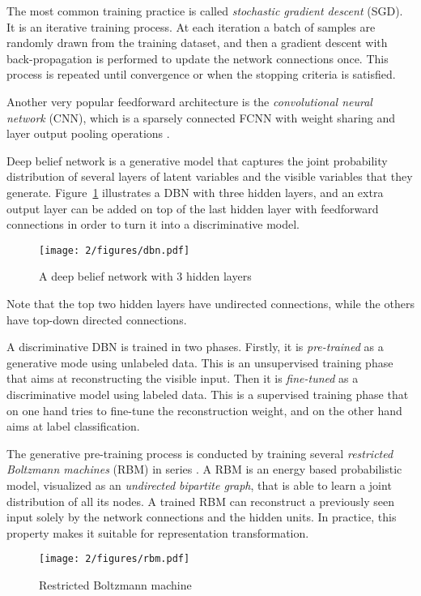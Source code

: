 The most common training practice is called {\it stochastic gradient descent} (SGD). It is an iterative training process. At each iteration a batch of samples are randomly drawn from the training dataset, and then a gradient descent with back-propagation is performed to update the network connections once. This process is repeated until convergence or when the stopping criteria is satisfied.

Another very popular feedforward architecture is the {\it convolutional neural network} (CNN), which is a sparsely connected FCNN with weight sharing and layer output pooling operations \cite{lecun1995convolutional}.

Deep belief network is a generative model that captures the joint probability distribution of several layers of latent variables and the visible variables that they generate. Figure~\ref{fig:2-dbn} illustrates a DBN with three hidden layers, and an extra output layer can be added on top of the last hidden layer with feedforward connections in order to turn it into a discriminative model.
\begin{figure}[htb]
\centering
\texttt{[image: 2/figures/dbn.pdf]}
\caption{A deep belief network with 3 hidden layers}
\label{fig:2-dbn}
\end{figure}
Note that the top two hidden layers have undirected connections, while the others have top-down directed connections.

A discriminative DBN is trained in two phases. Firstly, it is {\it pre-trained} as a generative mode using unlabeled data. This is an unsupervised training phase that aims at reconstructing the visible input. Then it is {\it fine-tuned} as a discriminative model using labeled data. This is a supervised training phase that on one hand tries to fine-tune the reconstruction weight, and on the other hand aims at label classification.

The generative pre-training process is conducted by training several {\it restricted Boltzmann machines} (RBM) in series \cite{hinton2006fast}. A RBM \cite{smolensky1986information} is an energy based probabilistic model, visualized as an {\it undirected bipartite graph}, that is able to learn a joint distribution of all its nodes. A trained RBM can reconstruct a previously seen input solely by the network connections and the hidden units. In practice, this property makes it suitable for representation transformation.
\begin{figure}[htb]
\centering
\texttt{[image: 2/figures/rbm.pdf]}
\caption{Restricted Boltzmann machine}
\label{fig:2-rbm}
\end{figure}

